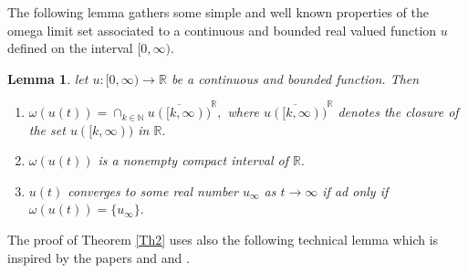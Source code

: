 \documentclass[11pt]{amsart}%
\theoremstyle{plain}
\numberwithin{equation}{section}
\newtheorem{lemma}{Lemma}[section]
\begin{document}
The following lemma gathers some simple and well known properties of the omega limit
set associated to a continuous and bounded real valued function $u$ defined
on the interval $[0,\infty ).$

\begin{lemma}
\label{l2}
let $u:[0,\infty )\to \mathbb{R}$ be a continuous and bounded
function. Then
\begin{enumerate}
\item $\omega (u(t))=\cap _{k\in \mathbb{N}}\overline{u([k,\infty ))}^{\mathbb{R}%
},$ where $\overline{u([k,\infty ))}^{\mathbb{R}}$ denotes the closure of
the set $u([k,\infty ))$ in $\mathbb{R}.$
\item $\omega (u(t))$ is a nonempty compact interval of $\mathbb{R}.$
\item $u(t)$ converges to some real number $u_{\infty }$ as $%
t\rightarrow \infty $ if ad only if $\omega (u(t))=\{u_{\infty }\}.$
\end{enumerate}
\end{lemma}
The proof of Theorem \ref{Th2} uses also the following technical lemma which is inspired by
the papers  and \cite{CC} and \cite{JM}.
\end{document}
